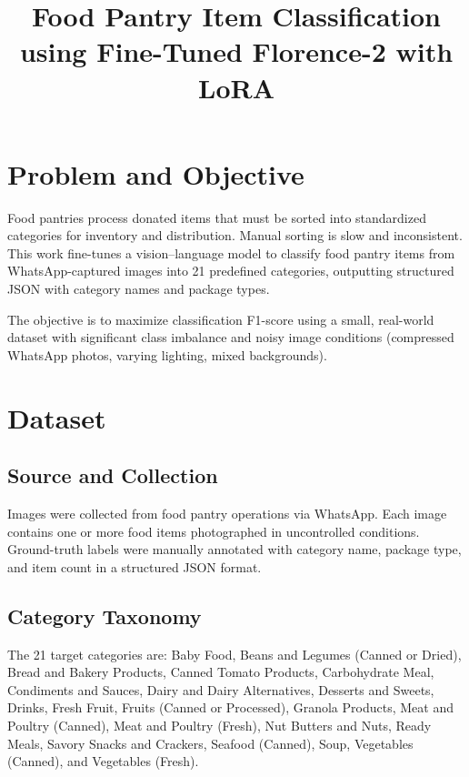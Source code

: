 \documentclass[11pt]{article}
\title{Food Pantry Item Classification using Fine-Tuned Florence-2 with LoRA}
\author{}
\date{}
\begin{document}
\maketitle

\section{Problem and Objective}

Food pantries process donated items that must be sorted into standardized categories for inventory and distribution. Manual sorting is slow and inconsistent. This work fine-tunes a vision--language model to classify food pantry items from WhatsApp-captured images into 21 predefined categories, outputting structured JSON with category names and package types.

The objective is to maximize classification F1-score using a small, real-world dataset with significant class imbalance and noisy image conditions (compressed WhatsApp photos, varying lighting, mixed backgrounds).

\section{Dataset}

\subsection{Source and Collection}

Images were collected from food pantry operations via WhatsApp. Each image contains one or more food items photographed in uncontrolled conditions. Ground-truth labels were manually annotated with category name, package type, and item count in a structured JSON format.

\subsection{Category Taxonomy}

The 21 target categories are: Baby Food, Beans and Legumes (Canned or Dried), Bread and Bakery Products, Canned Tomato Products, Carbohydrate Meal, Condiments and Sauces, Dairy and Dairy Alternatives, Desserts and Sweets, Drinks, Fresh Fruit, Fruits (Canned or Processed), Granola Products, Meat and Poultry (Canned), Meat and Poultry (Fresh), Nut Butters and Nuts, Ready Meals, Savory Snacks and Crackers, Seafood (Canned), Soup, Vegetables (Canned), and Vegetables (Fresh).
\end{document}
